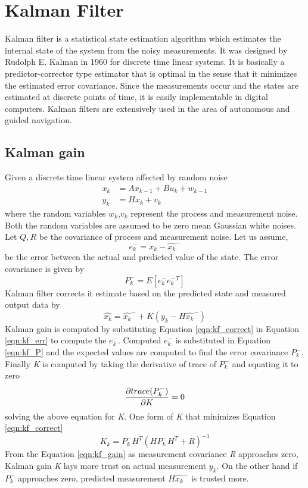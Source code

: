 \section{Kalman Filter}
Kalman filter is a statistical state estimation algorithm which estimates the internal state of the system from the noisy measurements. It was designed by Rudolph E. Kalman in 1960 for discrete time linear systems. It is basically a predictor-corrector type estimator that is optimal in the sense that it minimizes the estimated error covariance. Since the measurements occur and the states are estimated at discrete points of time, it is easily implementable in digital computers. Kalman filters are extensively used in the area of autonomous and guided navigation.

\subsection{Kalman gain}
Given a discrete time linear system affected by random noise
\begin{equation}
\begin{split}
x_{k} &= Ax_{k-1} + Bu_k + w_{k-1}\\
y_k &= Hx_k + v_k
\end{split}
\end{equation}
where the random variables $w_k$,$v_k$ represent the process and measurement noise. Both the random variables are assumed to be zero mean Gaussian white noises. Let $Q,R$ be the covariance of process and measurement noise. Let us assume, 
\begin{equation}\label{eqn:kf_err}
e_k^- = x_k - \hat{x_k}^- 
\end{equation} be the error between the actual and predicted value of the state. The error covariance is given by 
\begin{equation}\label{eqn:kf_P}
P_k^- = E[e_k^- {e_k^-}^T]
\end{equation} Kalman filter corrects it estimate based on the predicted state and measured output data by 
\begin{equation} \label{eqn:kf_correct}
\hat{x_k} = \hat{x_k}^- + K(y_k - H\hat{x_k}^-)
\end{equation}
Kalman gain is computed by substituting Equation \ref{eqn:kf_correct} in Equation \ref{eqn:kf_err} to compute the $e_k^-$. Computed $e_k^-$ is substituted in Equation \ref{eqn:kf_P} and the expected values are computed to find the error covariance $P_k^-$. Finally \emph{K} is computed by taking the derivative of trace of $P_k^-$ and equating it to zero $$ \frac{\partial {trace(P_k^-)}}{\partial {K}} = 0 $$ solving the above equation for \emph{K}. One form of \emph{K} that minimizes Equation \ref{eqn:kf_correct}
\begin{equation} \label{eqn:kf_gain}
 K_k = P_k^- H^T(H P_k^- H^T + R)^{-1}
\end{equation}
From the Equation \ref{eqn:kf_gain} as measurement covariance \emph{R} approaches zero, Kalman gain \emph{K} lays more trust on actual measurement $y_k$. On the other hand if $P_k^-$ approaches zero, predicted measurement $H\hat{x_k}^-$ is trusted more.

